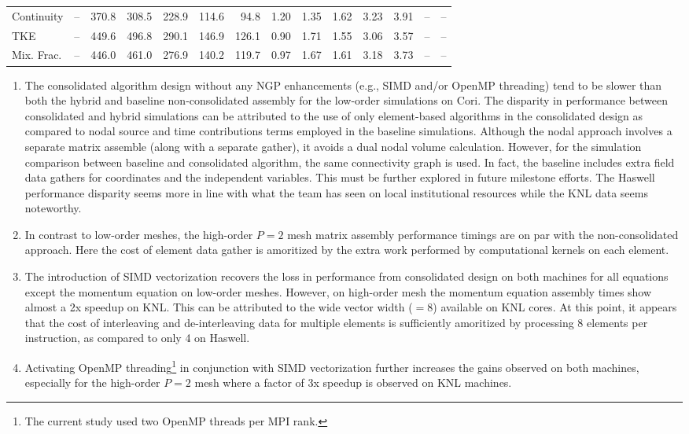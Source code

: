 \begin{landscape}
\begin{table}[tb]
\begin{tabular}{l|r|r|r|r|r|r|r|r|r|r|r|r|r}
      Continuity & -- & 370.8 & 308.5 & 228.9 & 114.6 & 94.8 & 1.20 & 1.35 & 1.62 & 3.23 & 3.91 & -- & --\\
      TKE & -- & 449.6 & 496.8 & 290.1 & 146.9 & 126.1 & 0.90 & 1.71 & 1.55 & 3.06 & 3.57 & -- & --\\
      Mix. Frac. & -- & 446.0 & 461.0 & 276.9 & 140.2 & 119.7 & 0.97 & 1.67 & 1.61 & 3.18 & 3.73 & -- & --\\ [1em]
      \hline\hline
    \end{tabular}
  \end{table}
\end{landscape}

\begin{enumerate}
\item The consolidated algorithm design without any NGP enhancements (e.g., SIMD
  and/or OpenMP threading) tend to be slower than both the hybrid and baseline 
  non-consolidated assembly for the low-order simulations on Cori. The disparity
  in performance between consolidated and hybrid simulations can be attributed 
  to the use of only element-based algorithms in the consolidated design as compared 
  to nodal source and time contributions terms employed in the baseline simulations.
  Although the nodal approach involves a separate matrix assemble (along with a separate 
  gather), it avoids a dual nodal volume calculation. However, for the simulation comparison 
  between baseline and consolidated algorithm, the same connectivity graph is used. In fact,
  the baseline includes extra field data gathers for coordinates and the independent
  variables. This must be further explored in future milestone efforts. The Haswell
  performance disparity seems more in line with what the team has seen on local 
  institutional resources while the KNL data seems noteworthy.
\item In contrast to low-order meshes, the high-order $P=2$ mesh matrix assembly
  performance timings are on par with the non-consolidated approach. Here the
  cost of element data gather is amoritized by the extra work performed by
  computational kernels on each element.
\item The introduction of SIMD vectorization recovers the loss in performance
  from consolidated design on both machines for all equations except the
  momentum equation on low-order meshes. However, on high-order mesh the
  momentum equation assembly times show almost a 2x speedup on KNL. This can be
  attributed to the wide vector width ($=8$) available on KNL cores. At this
  point, it appears that the cost of interleaving and de-interleaving data for
  multiple elements is sufficiently amoritized by processing 8 elements per
  instruction, as compared to only 4 on Haswell.
\item Activating OpenMP threading\footnote{The current study used two
    OpenMP threads per MPI rank.} in conjunction with SIMD vectorization further
  increases the gains observed on both machines, especially for the high-order
  $P=2$ mesh where a factor of 3x speedup is observed on KNL machines.
\end{enumerate}



